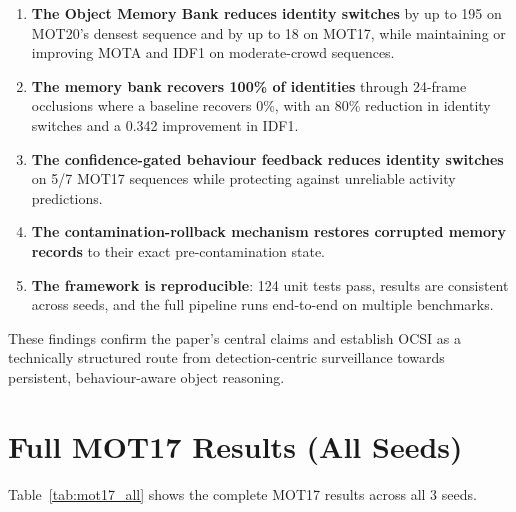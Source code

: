 \documentclass[11pt,a4paper]{article}
\begin{document}
\begin{enumerate}[leftmargin=2em]
    \item \textbf{The Object Memory Bank reduces identity switches} by up to 195 on MOT20's densest sequence and by up to 18 on MOT17, while maintaining or improving MOTA and IDF1 on moderate-crowd sequences.
    \item \textbf{The memory bank recovers 100\% of identities} through 24-frame occlusions where a baseline recovers 0\%, with an 80\% reduction in identity switches and a 0.342 improvement in IDF1.
    \item \textbf{The confidence-gated behaviour feedback reduces identity switches} on 5/7 MOT17 sequences while protecting against unreliable activity predictions.
    \item \textbf{The contamination-rollback mechanism restores corrupted memory records} to their exact pre-contamination state.
    \item \textbf{The framework is reproducible}: 124 unit tests pass, results are consistent across seeds, and the full pipeline runs end-to-end on multiple benchmarks.
\end{enumerate}

These findings confirm the paper's central claims and establish OCSI as a technically structured route from detection-centric surveillance towards persistent, behaviour-aware object reasoning.

\appendix

\section{Full MOT17 Results (All Seeds)}
Table~\ref{tab:mot17_all} shows the complete MOT17 results across all 3 seeds.
\end{document}
